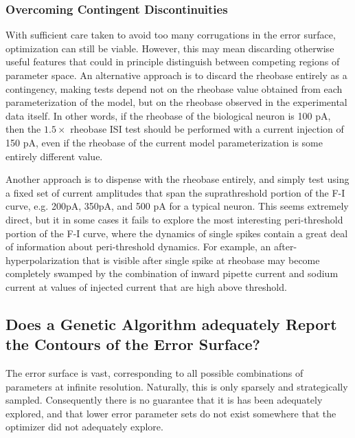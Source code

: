 

\subsubsection{Overcoming Contingent Discontinuities}
With sufficient care taken to avoid too many corrugations in the error surface,  optimization can still be viable.
However, this may mean discarding otherwise useful features that could in principle distinguish between competing regions of parameter space.
An alternative approach is to discard the rheobase entirely as a contingency,
making tests depend not on the rheobase value obtained from each parameterization of the model, but on the rheobase observed in the experimental data itself.
In other words, if the rheobase of the biological neuron is 100 pA, then the $1.5\times$ rheobase ISI test should be performed with a current injection of 150 pA, even if the rheobase of the current model parameterization is some entirely different value.

Another approach is to dispense with the rheobase entirely, and simply test using a fixed set of current amplitudes that span the suprathreshold portion of the F-I curve, e.g. 200pA, 350pA, and 500 pA for a typical neuron.
This seems extremely direct, but it in some cases it fails to explore the most interesting peri-threshold portion of the F-I curve, where the dynamics of single spikes contain a great deal of information about peri-threshold dynamics.
For example, an after-hyperpolarization that is visible after single spike at rheobase may become completely swamped by the combination of inward pipette current and sodium current at values of injected current that are high above threshold.

\subsection{Does a Genetic Algorithm adequately Report the Contours of the Error Surface?}
The error surface is vast, corresponding to all possible combinations of parameters at infinite resolution.
Naturally, this is only sparsely and strategically sampled.
Consequently there is no guarantee that it is has been adequately explored, and that lower error parameter sets do not exist somewhere that the optimizer did not adequately explore.

